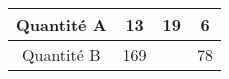 \begin{tabular}{|c|c|c|c|}
\hline
Quantité A & 13 & 19 & 6 \\ \hline
Quantité B & 169 & \kern1cm & 78 \\ \hline
\end{tabular}

